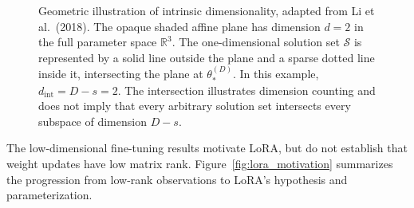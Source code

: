 \begin{figure}[htbp]

	\caption{
		Geometric illustration of intrinsic dimensionality,
		adapted from Li et al.~(2018).
		The opaque shaded affine plane has dimension $d=2$
		in the full parameter space $\mathbb R^3$.
		The one-dimensional solution set $\mathcal S$ is
		represented by a solid line outside the plane and
		a sparse dotted line inside it, intersecting the
		plane at $\theta_*^{(D)}$.
		In this example, $d_{\mathrm{int}}=D-s=2$.
		The intersection illustrates dimension counting
		and does not imply that every arbitrary solution set
		intersects every subspace of dimension $D-s$.
	}
	\label{fig:intrinsic_dimension}

\end{figure}

The low-dimensional fine-tuning results motivate LoRA, but do not establish that weight updates have low matrix rank. Figure~\ref{fig:lora_motivation} summarizes the progression from low-rank observations to LoRA's hypothesis and parameterization.




